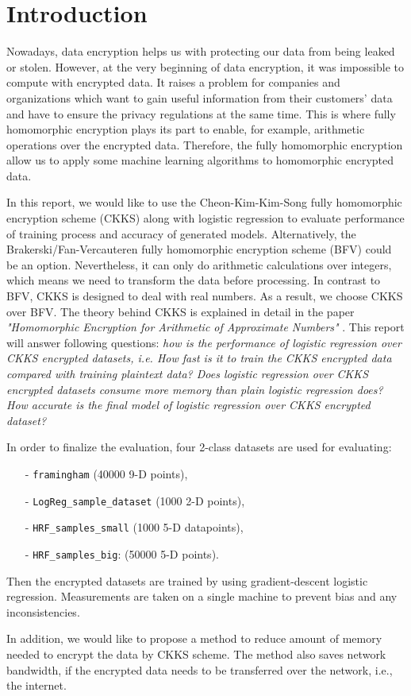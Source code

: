 \section{Introduction}
    \begin{text}
    Nowadays, data encryption helps us with protecting our data from being leaked or stolen. However, at the very beginning of data encryption, it was impossible to compute with encrypted data. It raises a problem for companies and organizations which want to gain useful information from their customers' data and have to ensure the privacy regulations at the same time. This is where fully homomorphic encryption plays its part to enable, for example, arithmetic operations over the encrypted data. Therefore, the fully homomorphic encryption allow us to apply some machine learning algorithms to homomorphic encrypted data. 
    
    In this report, we would like to use the Cheon-Kim-Kim-Song fully homomorphic encryption scheme (CKKS) along with logistic regression to evaluate performance of training process and accuracy of generated models. Alternatively, the Brakerski/Fan-Vercauteren fully homomorphic encryption scheme (BFV) \cite{fan2012somewhat} could be an option. Nevertheless, it can only do arithmetic calculations over integers, which means we need to transform the data before processing. In contrast to BFV, CKKS is designed to deal with real numbers. As a result, we choose CKKS over BFV. The theory behind CKKS is explained in detail in the paper \textit{"Homomorphic Encryption for Arithmetic of Approximate Numbers"} \cite{cheon2017homomorphic}. This report will answer following questions: \textit{how is the performance of logistic regression over CKKS encrypted datasets, i.e. How fast is it to train the CKKS encrypted data compared with training plaintext data? Does logistic regression over CKKS encrypted datasets consume more memory than plain logistic regression does? How accurate is the final model of logistic regression over CKKS encrypted dataset?}

    In order to finalize the evaluation, four 2-class datasets are used for evaluating:
    \begin{itemize}[nosep]
        \item[-] \texttt{framingham} (40000 9-D points),
        \item[-] \texttt{LogReg\_sample\_dataset} (1000 2-D points),
        \item[-] \texttt{HRF\_samples\_small} (1000 5-D datapoints),
        \item[-] \texttt{HRF\_samples\_big}: (50000 5-D points).
    \end{itemize}
    Then the encrypted datasets are trained by using gradient-descent logistic regression. Measurements are taken on a single machine to prevent bias and any inconsistencies. 
    
    In addition, we would like to propose a method to reduce amount of memory needed to encrypt the data by CKKS scheme. The method also saves network bandwidth, if the encrypted data needs to be transferred over the network, i.e., the internet.
    \end{text}